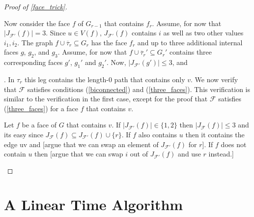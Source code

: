 \documentclass{patmorin}
\begin{document}
\begin{proof}[Proof of \cref{face_trick}]
\begin{enumerate}
    Now consider the face $f$ of $G_{r-1}$ that contains $f_r$.  Assume, for now that $|J_{\mathcal{F'}}(f)|=3$.  Since $u\in V(f)$, $J_{\mathcal{F'}}(f)$ contains $i$ as well as two other values $i_1,i_2$.  The graph $f\cup\overline{\tau}_r\subseteq G_r$ has the face $f_r$ and up to three additional internal faces $g$, $g_2$, and $g_3$.  Assume, for now that $f\cup\overline{\tau}_r'\subseteq G_r'$ contains three corresponding faces $g'$, $g_1'$ and $g_2'$.  Now, $|J_{\mathcal{F'}}(g')|\le 3$, and






    .  In $\tau_r$ this leg contains the length-$0$ path that contains only $v$.  We now verify that $\mathcal{F}$ satisfies conditions (\ref{biconnected}) and (\ref{three_faces}).  This verification is similar to the verification in the first case, except for the proof that $\mathcal{F}$ satisfies (\ref{three_faces}) for a face $f$ that contains $v$.

    Let $f$ be a face of $G$ that contains $v$.  If $|J_{\mathcal{F}'}(f)|\in\{1,2\}$ then $|J_{\mathcal{F}}(f)|\le 3$ and its easy since $J_{\mathcal{F}}(f)\subseteq J_{\mathcal{F'}}(f)\cup\{r\}$.  If $f$ also contains $u$ then it contains the edge uv and [argue that we can swap an element of $J_{\mathcal{F}'}(f)$ for $r$].  If $f$ does not contain $u$ then [argue that we can swap $i$ out of $J_{\mathcal{F}'}(f)$ and use $r$ instead.]  \qedhere
  \end{enumerate}
\end{proof}


\section{A Linear Time Algorithm}




\end{document}
